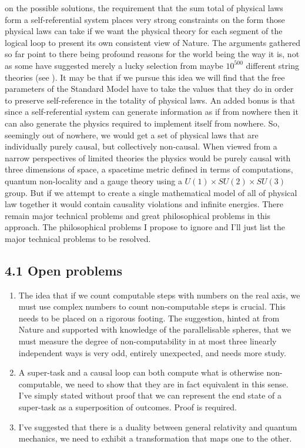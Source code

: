 \documentclass[
   ,final            %
  ]
  {aipproc}
\begin{document}
on the possible solutions, the requirement that the sum total of physical laws form a self-referential system places very strong constraints on the %
form those physical laws can take if we want the physical theory for each segment of the logical loop to present its own consistent view of Nature. %
The arguments gathered so far point to there being profound reasons for the world being the way it is, not as some have suggested merely a lucky %
selection from maybe $10^{500}$ different string theories (see \citet{susskind_2003,susskind_2003_ns}). It may be that if we pursue this idea we will %
find that the free parameters of the Standard Model have to take the values that they do in order to preserve self-reference in the totality of %
physical laws.  An added bonus is that since a self-referential system can generate information as if from nowhere then it can also generate the %
physics required to implement itself from nowhere. So, seemingly out of nowhere, we would get a set of physical laws that are individually purely %
causal, but collectively non-causal. When viewed from a narrow perspectives of limited theories the physics would be purely causal with three %
dimensions of space, a spacetime metric defined in terms of computations, quantum non-locality and a gauge theory using a $U(1) \times SU(2) \times %
SU(3)$ group. But if we attempt to create a single mathematical model of all of physical law together it would contain causality violations and %
infinite energies. There remain major technical problems and great philosophical problems in this approach. The philosophical problems I propose to %
ignore and I'll just list the major technical problems to be resolved. 
\subsection{4.1 Open problems}
\begin{enumerate}[(1)]
\item %
The idea that if we count computable steps with numbers on the real axis, we must use complex
numbers to count non-computable steps is crucial. This needs to be placed on a rigorous footing. The suggestion, hinted at from Nature and supported %
with knowledge of the parallelisable spheres, that we must measure the degree of non-computability in at most three linearly independent ways is very %
odd, entirely unexpected, and needs more study. 
\item %
A super-task and a causal loop can both compute what is otherwise non-computable, we need to show
that they are in fact equivalent in this sense. I've simply stated without proof that we can represent the end state of a super-task as a %
superposition of outcomes. Proof is required. 
\item %
I've suggested that there is a duality between general relativity and quantum mechanics, we need to exhibit a transformation that maps one to the %
other.
\end{enumerate}


\end{document}
